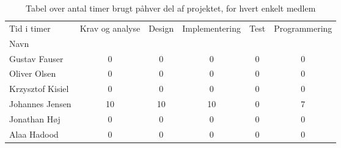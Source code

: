 \begin{table}[H]
\begin{tabular}{lccccc}
\hline
\multicolumn{1}{|l|}{Tid i timer} & Krav og analyse & \multicolumn{1}{l}{Design} & Implementering & Test & Programmering \\ \cline{2-6} 
\multicolumn{1}{|l|}{Navn} &  & \multicolumn{1}{l}{} &  &  &  \\ \cline{1-1}
Gustav Fauser & 0 & 0 & 0 & 0 &  0  \\
Oliver Olsen & 0 & 0 & 0 & 0 & 0 \\
Krzysztof Kisiel & 0 & 0 & 0 & 0 & 0  \\
Johannes Jensen & 10 & 10 & 10 & 0 & 7 \\
Jonathan H\o j & 0 & 0 & 0 & 0 & 0 \\
Alaa Hadood & 0 & 0 & 0 & 0 & 0 \\ \hline
\end{tabular}
\caption{Tabel over antal timer brugt p\aa \space hver del af projektet, for hvert enkelt medlem}
\label{table:timeplan}
\end{table}

